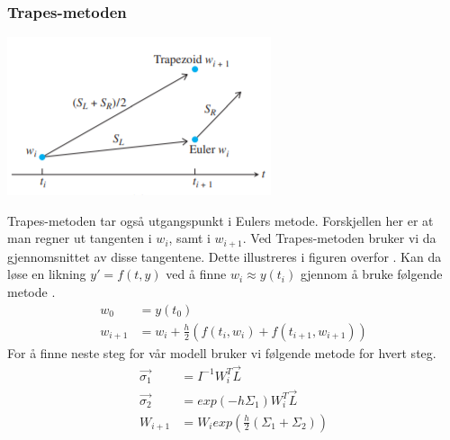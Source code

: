 \subsubsection{Trapes-metoden}
\begin{center}
    \includegraphics{rapport/teori/bilder/trapezoid.PNG}
\end{center}
Trapes-metoden tar også utgangspunkt i Eulers metode. Forskjellen her er at man regner ut tangenten i $w_i$, samt i $w_{i+1}$. Ved Trapes-metoden bruker vi da gjennomsnittet av disse tangentene. Dette illustreres i figuren overfor \cite{MATEMATIKK:1}.\newline\newline
Kan da løse en likning $y' = f(t, y)$ ved å finne $w_i \approx y(t_i)$ gjennom å bruke følgende metode \cite{MATEMATIKK:1}. 
\begin{equation}
\begin{aligned}
    w_0&=y(t_0)\\
    w_{i+1}&=w_i + \frac{h}{2}(f(t_i, w_i)+f(t_{i+1}, w_{i+1}))
\end{aligned}
\end{equation}
For å finne neste steg for vår modell bruker vi følgende metode for hvert steg.
\begin{equation}
\begin{aligned}
    \Vec{\sigma_1}&=I^{-1}W^T_i\Vec{L}\\
    \Vec{\sigma_2}&=exp(-h\Sigma_1)W^T_i\Vec{L}\\
    W_{i+1}&=W_iexp(\frac{h}{2}(\Sigma_1 + \Sigma_2))
\end{aligned}
\end{equation}

